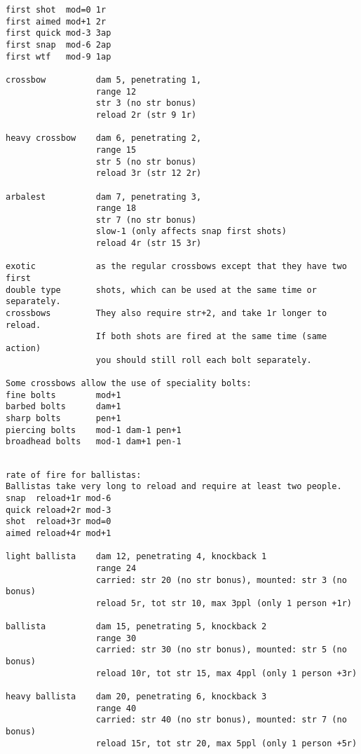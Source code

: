 \begin{verbatim}
first shot  mod=0 1r
first aimed mod+1 2r
first quick mod-3 3ap
first snap  mod-6 2ap
first wtf   mod-9 1ap

crossbow          dam 5, penetrating 1,
                  range 12
                  str 3 (no str bonus)
                  reload 2r (str 9 1r)

heavy crossbow    dam 6, penetrating 2,
                  range 15
                  str 5 (no str bonus)
                  reload 3r (str 12 2r)

arbalest          dam 7, penetrating 3,
                  range 18
                  str 7 (no str bonus)
                  slow-1 (only affects snap first shots)
                  reload 4r (str 15 3r)

exotic            as the regular crossbows except that they have two first
double type       shots, which can be used at the same time or separately.
crossbows         They also require str+2, and take 1r longer to reload.
                  If both shots are fired at the same time (same action)
                  you should still roll each bolt separately.

Some crossbows allow the use of speciality bolts:
fine bolts        mod+1
barbed bolts      dam+1
sharp bolts       pen+1
piercing bolts    mod-1 dam-1 pen+1
broadhead bolts   mod-1 dam+1 pen-1


\end{verbatim} \pagebreak[1] \begin{verbatim}
rate of fire for ballistas:
Ballistas take very long to reload and require at least two people.
snap  reload+1r mod-6
quick reload+2r mod-3
shot  reload+3r mod=0
aimed reload+4r mod+1

light ballista    dam 12, penetrating 4, knockback 1
                  range 24
                  carried: str 20 (no str bonus), mounted: str 3 (no bonus)
                  reload 5r, tot str 10, max 3ppl (only 1 person +1r)

ballista          dam 15, penetrating 5, knockback 2
                  range 30
                  carried: str 30 (no str bonus), mounted: str 5 (no bonus)
                  reload 10r, tot str 15, max 4ppl (only 1 person +3r)

heavy ballista    dam 20, penetrating 6, knockback 3
                  range 40
                  carried: str 40 (no str bonus), mounted: str 7 (no bonus)
                  reload 15r, tot str 20, max 5ppl (only 1 person +5r)

\end{verbatim}
\normalsize









